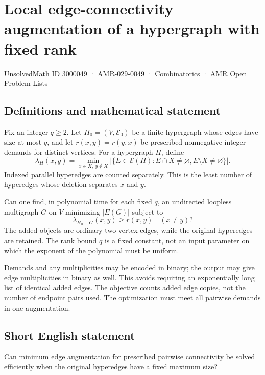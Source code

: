 \documentclass[11pt,a4paper]{article}
\begin{document}
\section*{Local edge-connectivity augmentation of a hypergraph with fixed rank}\label{3000049}
{\small UnsolvedMath ID 3000049 · AMR-029-0049 · Combinatorics · AMR Open Problem Lists}
\subsection{Definitions and mathematical statement}
Fix an integer $q\ge2$. Let $H_0=(V,\mathcal E_0)$ be a finite
hypergraph whose edges have size at most $q$, and let
$r(x,y)=r(y,x)$ be prescribed nonnegative integer demands for distinct
vertices. For a hypergraph $H$, define
\[
 \lambda_H(x,y)=\min_{x\in X,\ y\notin X}
       |\{E\in\mathcal E(H):E\cap X\ne\varnothing,
                              E\setminus X\ne\varnothing\}|.
\]
Indexed parallel hyperedges are counted separately. This is the least
number of hyperedges whose deletion separates $x$ and $y$.

Can one find, in polynomial time for each fixed $q$, an undirected
loopless multigraph $G$ on $V$ minimizing $|E(G)|$ subject to
\[
                          \lambda_{H_0+G}(x,y)\ge r(x,y)
                                        \quad(x\ne y)?
\]
The added objects are ordinary two-vertex edges, while the original
hyperedges are retained. The rank bound $q$ is a fixed constant,
not an input parameter on which the exponent of the polynomial must
be uniform.

Demands and any multiplicities may be encoded in binary; the output
may give edge multiplicities in binary as well. This avoids requiring
an exponentially long list of identical added edges. The objective
counts added edge copies, not the number of endpoint pairs used.
The optimization must meet all pairwise demands in one augmentation.
\subsection{Short English statement}
Can minimum edge augmentation for prescribed pairwise connectivity
be solved efficiently when the original hyperedges have a fixed maximum size?
\end{document}
